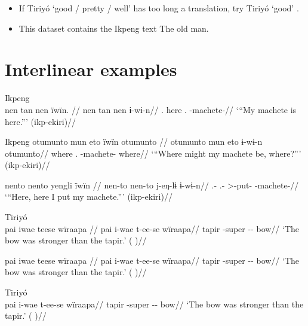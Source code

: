 \documentclass{memoir}
\begin{document}
\begin{itemize}
\item
  If Tiriyó  `good / pretty / well'
  \parencites[345]{triomeira1999} has too long a translation, try Tiriyó
   `good' \parencites[345]{triomeira1999}.
\item
  This dataset contains the Ikpeng text The old man.
\end{itemize}

\chapter{\texorpdfstring{Interlinear
examples\label{interlinear-examples}}{Interlinear examples}}

\ex  Ikpeng  \\\label{ekiri-13}
\begingl \glpreamble nen tan nen ïwïn. //
\gla nen tan nen ɨ-wɨ-n//
\glb {}. here . -machete-//
\glft ‘“My machete is here.”’ (ikp-ekiri)//
\endgl
\xe

\pex Ikpeng    
\a \label{ekiri-9}
\begingl \glpreamble otumunto mun eto ïwïn otumunto //
\gla otumunto mun eto ɨ-wɨ-n otumunto//
\glb where .  -machete- where//
\glft ‘“Where might my machete be, where?”’ (ikp-ekiri)//
\endgl

    
\a \label{ekiri-10}
\begingl \glpreamble nento nento yengli ïwïn //
\gla nen-to nen-to j-eŋ-lɨ ɨ-wɨ-n//
\glb {}.- .- >-put- -machete-//
\glft ‘“Here, here I put my machete.”’ (ikp-ekiri)//
\endgl

\xe

\ex  Tiriyó  \\\label{tri-1}
\begingl \glpreamble pai iwae teese wïraapa //
\gla pai i-wae t-ee-se wïraapa//
\glb tapir -super -- bow//
\glft ‘The bow was stronger than the tapir.’ (\cite[420]{triomeira1999}
)//
\endgl
\xe

\ex \label{tri-1}
\begingl \glpreamble pai iwae teese wïraapa //
\gla pai i-wae t-ee-se wïraapa//
\glb tapir -super -- bow//
\glft ‘The bow was stronger than the tapir.’ (\cite[420]{triomeira1999}
)//
\endgl
\xe

\ex  Tiriyó  \\\label{tri-1}
\begingl 
\gla pai i-wae t-ee-se wïraapa//
\glb tapir -super -- bow//
\glft ‘The bow was stronger than the tapir.’ (\cite[420]{triomeira1999}
)//
\endgl
\xe
\end{document}
